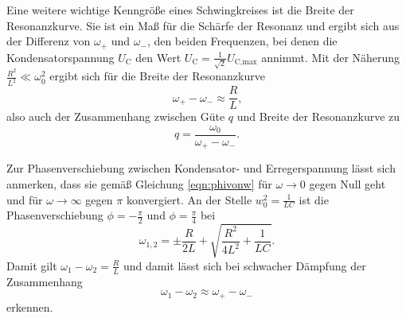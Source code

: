 Eine weitere wichtige Kenngröße eines Schwingkreises ist die Breite der Resonanzkurve.
Sie ist ein Maß für die Schärfe der Resonanz und ergibt sich aus der Differenz von
$\omega_+$ und $\omega_-$, den beiden Frequenzen, bei denen die Kondensatorspannung $U_{\text{C}}$ den Wert $U_{\text{C}} = \frac{1}{\sqrt{2}} U_{\text{C,max}}$ annimmt.
Mit der Näherung $\frac{R^2}{L^2} \ll \omega_0^2$ ergibt sich für die Breite der Resonanzkurve
\begin{equation}
	\omega_+ - \omega_- \approx \frac{R}{L} \text{,}
\end{equation}
also auch der Zusammenhang zwischen Güte $q$ und Breite der Resonanzkurve zu
\begin{equation}
	q = \frac{\omega_0}{\omega_+ - \omega_-} \text{.}
\end{equation}

Zur Phasenverschiebung zwischen Kondensator- und Erregerspannung lässt sich anmerken,
dass sie gemäß Gleichung \eqref{eqn:phivonw} für $\omega \to 0$ gegen Null geht und für
$\omega \to \infty$ gegen $\pi$ konvergiert.
An der Stelle $w_0^2 = \frac{1}{LC}$ ist die Phasenverschiebung $\phi = -\frac{\pi}{2}$ und
$\phi = \frac{\pi}{4}$ bei
\begin{equation}
	\omega_{1,2} = \pm \frac{R}{2L} + \sqrt{\frac{R^2}{4L^2} + \frac{1}{LC}} \text{.}
\end{equation}
Damit gilt $\omega_1 - \omega_2 = \frac{R}{L}$ und damit lässt sich bei schwacher Dämpfung
der Zusammenhang
\begin{equation}
	\omega_1 - \omega_2 \approx \omega_+ - \omega_-
\end{equation}
erkennen.
